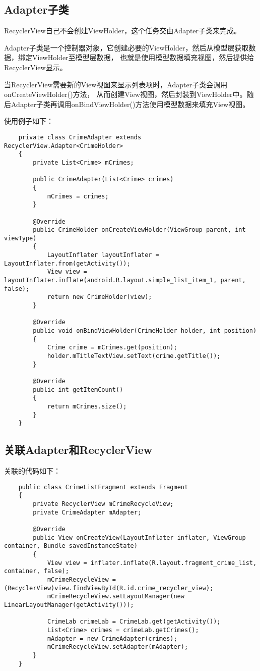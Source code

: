 \documentclass[a4paper,left=2.5cm,right=2.5cm,11pt]{article}
\begin{document}
\subsection{Adapter子类}
	RecyclerView自己不会创建ViewHolder，这个任务交由Adapter子类来完成。\par

	Adapter子类是一个控制器对象，它创建必要的ViewHolder，然后从模型层获取数据，绑定ViewHolder至模型层数据，
	也就是使用模型数据填充视图，然后提供给RecyclerView显示。\par

	当RecyclerView需要新的View视图来显示列表项时，Adapter子类会调用onCreateViewHolder()方法，
	从而创建View视图，然后封装到ViewHolder中。随后Adapter子类再调用onBindViewHolder()方法使用模型数据来填充View视图。\par

	使用例子如下：
	\begin{lstlisting}
	private class CrimeAdapter extends RecyclerView.Adapter<CrimeHolder>
	{
		private List<Crime> mCrimes;

		public CrimeAdapter(List<Crime> crimes)
		{
			mCrimes = crimes;
		}

		@Override
		public CrimeHolder onCreateViewHolder(ViewGroup parent, int viewType)
		{
			LayoutInflater layoutInflater = LayoutInflater.from(getActivity());
			View view = layoutInflater.inflate(android.R.layout.simple_list_item_1, parent, false);
			return new CrimeHolder(view);
		}

		@Override
		public void onBindViewHolder(CrimeHolder holder, int position)
		{
			Crime crime = mCrimes.get(position);
			holder.mTitleTextView.setText(crime.getTitle());
		}

		@Override
		public int getItemCount()
		{
			return mCrimes.size();
		}
	}
	\end{lstlisting}

\subsection{关联Adapter和RecyclerView}
	关联的代码如下：
	\begin{lstlisting}
	public class CrimeListFragment extends Fragment
	{
		private RecyclerView mCrimeRecycleView;
		private CrimeAdapter mAdapter;

		@Override
		public View onCreateView(LayoutInflater inflater, ViewGroup container, Bundle savedInstanceState)
		{
			View view = inflater.inflate(R.layout.fragment_crime_list, container, false);
			mCrimeRecycleView = (RecyclerView)view.findViewById(R.id.crime_recycler_view);
			mCrimeRecycleView.setLayoutManager(new LinearLayoutManager(getActivity()));

			CrimeLab crimeLab = CrimeLab.get(getActivity());
			List<Crime> crimes = crimeLab.getCrimes();
			mAdapter = new CrimeAdapter(crimes);
			mCrimeRecycleView.setAdapter(mAdapter);
		}
	}
	\end{lstlisting}
\end{document}
